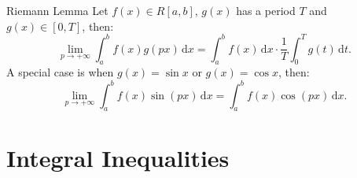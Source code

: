 \documentclass[11pt]{../../TexTemplate/elegantbook}
\begin{document}
\begin{lemma}{Riemann Lemma}
    Let \( f(x) \in R[a, b] \), \( g(x) \) has a period \( T \) and \( g(x) \in [0, T] \),
    then:
    \[
    \lim_{p \to +\infty}\int_{a}^{b} f(x)g(px) \, \mathrm{d}x 
    = \int_{a}^{b} f(x) \, \mathrm{d}x \cdot \frac{1}{T} \int_{0}^{T} g(t) \, \mathrm{d}t.
    \]
    A special case is when \( g(x) = \sin x \) or \( g(x) = \cos x \), then:
    \[
    \lim_{p \to +\infty}\int_{a}^{b} f(x)\sin(px) \, \mathrm{d}x 
    = \int_{a}^{b} f(x)\cos(px) \, \mathrm{d}x.
    \]
\end{lemma}

\section{Integral Inequalities}
\end{document}
